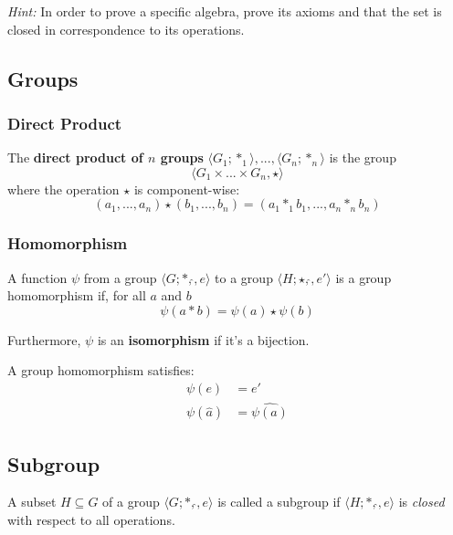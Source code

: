 \documentclass[11pt]{article}
\begin{document}
\emph{Hint:} In order to prove a specific algebra, prove its axioms and that the set is closed in correspondence to its operations.

\subsection{Groups}

\subsubsection{Direct Product}

The \textbf{direct product of $n$ groups} $\langle G_1; *_1\rangle, ..., \langle G_n; *_n\rangle$ is the group
\begin{equation*}
	\langle G_1 \times ... \times G_n, \star\rangle
\end{equation*}
where the operation $\star$ is component-wise:
\begin{equation*}
	(a_1,..., a_n) \star (b_1,...,b_n) = (a_1 *_1 b_1,...,a_n *_n b_n)
\end{equation*}

\subsubsection{Homomorphism}

A function $\psi$ from a group $\langle G; *, \hat{}, e\rangle$ to a group $\langle H; \star, \hat{}, e'\rangle$ is a group homomorphism if, for all $a$ and $b$
\begin{equation*}
	\psi(a * b) = \psi(a) \star \psi(b)
\end{equation*}

Furthermore, $\psi$ is an \textbf{isomorphism} if it's a bijection.

A group homomorphism satisfies:
\begin{equation*}
\begin{split}
	\psi(e) & = e' \\
	\psi(\hat{a}) & = \widehat{\psi(a)}
\end{split}
\end{equation*}

\subsection{Subgroup}

A subset $H \subseteq G$ of a group $\langle G; *, \hat{}, e\rangle$ is called a subgroup if $\langle H; *, \hat{}, e\rangle$ is \emph{closed} with respect to all operations.
\end{document}

